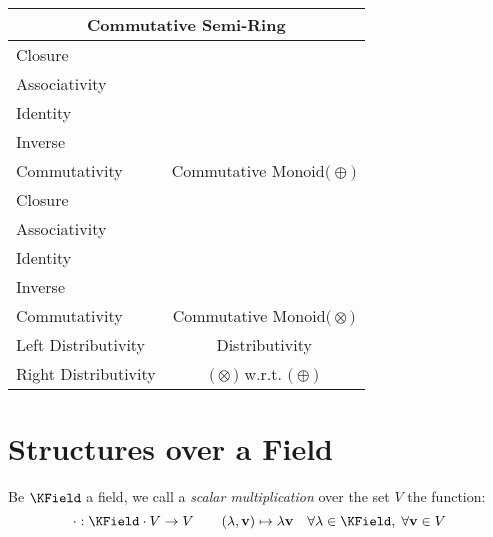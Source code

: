 \documentclass[a4paper,12pt]{scrartcl}    %
\newcommand{\OpA}{\otimes}
\newcommand{\OpB}{\oplus}
\begin{document}
\begin{minipage}[c]{0,5\textwidth}
\vspace{0.6cm}
\begin{tabular}{|l|c|} %
  \hline
  \multicolumn{2}{c}{\cellcolor{green!25}Commutative Semi-Ring} \\
  \hline
    \cellcolor{blue!25} Closure& \cellcolor{yellow!25}  \\
    \cellcolor{blue!25} Associativity& \cellcolor{yellow!25}  \\
    \cellcolor{blue!25} Identity& \cellcolor{yellow!25} \\
    \cellcolor{red!25} Inverse& \cellcolor{yellow!25} \\
    \cellcolor{blue!25} Commutativity& \multirow{-5}{*}{\tiny\cellcolor{yellow!25}Commutative Monoid$\big(\OpB\big)$} \\
   \hline
    \cellcolor{blue!25} Closure& \cellcolor{yellow!25}  \\
    \cellcolor{blue!25} Associativity& \cellcolor{yellow!25}  \\
    \cellcolor{blue!25} Identity& \cellcolor{yellow!25} \\
    \cellcolor{red!25} Inverse& \cellcolor{yellow!25} \\
    \cellcolor{blue!25} Commutativity& \multirow{-5}{*}{\tiny\cellcolor{yellow!25}Commutative Monoid$\big(\OpA\big)$} \\
  \hline
  	\cellcolor{blue!25} Left Distributivity&  \tiny\cellcolor{yellow!25}Distributivity\\
    \cellcolor{blue!25} Right Distributivity & \tiny\cellcolor{yellow!25} $\big(\OpA\big)$ w.r.t. $\big(\OpB\big)$  \\
   \hline
\end{tabular}

\end{minipage}

\newpage
\section{Structures over a Field}
Be $\KField$ a field, we call a \emph{scalar multiplication} over the set $V$ the function:
	\begin{displaymath}
		\cdot : \KField \cdot V \rightarrow  V \qquad (\lambda, \mathbf{v}) \mapsto \lambda \mathbf{v} \quad \forall \lambda \in \KField,\; 
		\forall \mathbf{v} \in V
	\end{displaymath}
\end{document}
